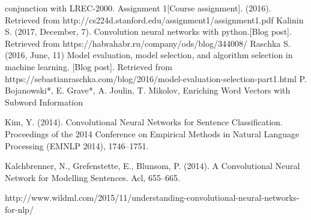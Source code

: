 \begin{thebibliography}
	 conjunction with LREC-2000.
	 {}
	  Assignment 1[Course assignment]. (2016). Retrieved from http://cs224d.stanford.edu/assignment1/assignment1.pdf 
	 {}
		Kalinin S. (2017, December, 7). Convolution neural networks with python.[Blog post]. Retrieved from https://habrahabr.ru/company/ods/blog/344008/
		Raschka S. (2016, June, 11) Model evaluation, model selection, and algorithm selection in machine learning. [Blog post]. Retrieved from
		https://sebastianraschka.com/blog/2016/model-evaluation-selection-part1.html
	 P. Bojanowski*, E. Grave*, A. Joulin, T. Mikolov, Enriching Word Vectors with Subword Information

	Kim, Y. (2014). Convolutional Neural Networks for Sentence Classification. Proceedings of the 2014 Conference on Empirical Methods in Natural Language Processing (EMNLP 2014), 1746–1751.
	
	Kalchbrenner, N., Grefenstette, E.,  Blunsom, P. (2014). A Convolutional Neural Network for Modelling Sentences. Acl, 655–665.
	
	http://www.wildml.com/2015/11/understanding-convolutional-neural-networks-for-nlp/
\end{thebibliography}
